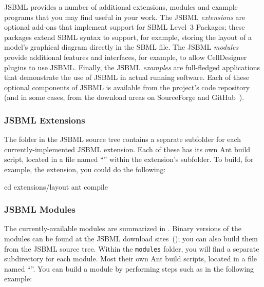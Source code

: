 JSBML provides a number of additional extensions, modules and example
programs that you may find useful in your work.  The JSBML \emph{extensions} are
optional add-ons that implement support for SBML Level~3 Packages; these
packages extend SBML syntax to support, for example, storing the layout of
a model's graphical diagram directly in the SBML file.  The JSBML
\emph{modules} provide additional features and interfaces, for example, to
allow CellDesigner~\cite{Funahashi2003} plugins to use JSBML.  Finally, the
JSBML \emph{examples} are full-fledged applications that demonstrate the
use of JSBML in actual running software.  Each of these optional components
of JSBML is available from the project's code repository (and in some
cases, from the download areas on SourceForge and
GitHub~\cite{JSBMLdownloadSF, JSBMLdownloadGitHub}).


\subsubsection{JSBML Extensions}

The  folder in the JSBML source tree contains a separate
subfolder for each currently-implemented JSBML extension.
Each of these has its own Ant build script, located in a file
named ``'' within the extension's
subfolder.  To build, for example, the  extension, you could
do the following:

\begin{example}[style=bash, title={Compiling the JSBML ``\code{layout}'' extension.}]
cd extensions/layout
ant compile
\end{example}

\vspace*{-2ex}

\subsubsection{JSBML Modules}
\label{sec:jsbml-modules}

The currently-available modules are summarized in
.  Binary versions of the modules can be
found at the JSBML download sites~(\cite{JSBMLdownloadSF,
  JSBMLdownloadGitHub}); you can also build them from the JSBML
source tree.  Within the \texttt{modules} folder, you will find a
separate subdirectory for each module.  Most their own Ant build
scripts, located in a file named ``''.  You can
build a module by performing steps such as in the following
example:

